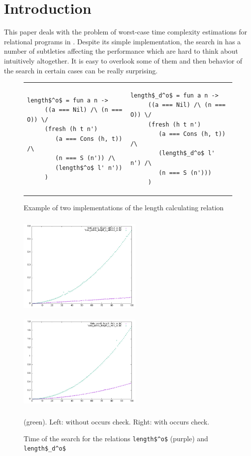 \section{Introduction}

This paper deals with the problem of worst-case time complexity estimations for relational programs in \mK. Despite its simple implementation, the search in \mK has a number of subtleties
affecting the performance which are hard to think about intuitively altogether. It is easy to overlook some of them and then behavior of the search in certain cases can be really surprising.

\begin{figure}[t]
\begin{tabular}{p{5cm}p{5cm}}
\begin{lstlisting}[basicstyle=\small]
   length$^o$ = fun a n ->
     ((a === Nil) /\ (n === O)) \/
     (fresh (h t n')
        (a === Cons (h, t)) /\
        (n === S (n')) /\
        (length$^o$ l' n'))
     )
\end{lstlisting} &
\begin{lstlisting}[basicstyle=\small]
   length$_d^o$ = fun a n ->
     ((a === Nil) /\ (n === O)) \/
     (fresh (h t n')
        (a === Cons (h, t)) /\
        (length$_d^o$ l' n') /\
        (n === S (n')))
     )
\end{lstlisting}
\end{tabular}
\caption{Example of two implementations of the length calculating relation}
\label{fig:length_implementations}
\end{figure}

\begin{figure}[t]
    \includegraphics[width=6cm,height=5cm]{lengths_without_oc.png}
    \includegraphics[width=6cm,height=5cm]{lengths_with_oc.png}
  \caption{Time of the search for the relations \lstinline|length$^o$| (purple) and \lstinline|length$_d^o$|} (green).
  Left: without occurs check.
  Right: with occurs check.
  \label{fig:length_plots}
\end{figure}


